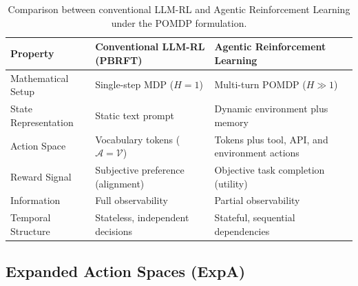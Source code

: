 \begin{table}[htbp]
\centering
\footnotesize
\begin{tabularx}{\textwidth}{YYY}
\toprule
\textbf{Property} & \textbf{Conventional LLM-RL (PBRFT)} & \textbf{Agentic Reinforcement Learning} \\
\midrule
Mathematical Setup & Single-step MDP ($H = 1$) & Multi-turn POMDP ($H \gg 1$) \\
State Representation & Static text prompt & Dynamic environment plus memory \\
Action Space & Vocabulary tokens ($\mathcal{A} = \mathcal{V}$) & Tokens plus tool, API, and environment actions \\
Reward Signal & Subjective preference (alignment) & Objective task completion (utility) \\
Information & Full observability & Partial observability \\
Temporal Structure & Stateless, independent decisions & Stateful, sequential dependencies \\
\bottomrule
\end{tabularx}
\caption{Comparison between conventional LLM-RL and Agentic Reinforcement Learning under the POMDP formulation.}
\label{tbl:llm-rl-vs-agentic}
\end{table}

\subsection{Expanded Action Spaces (ExpA)}

